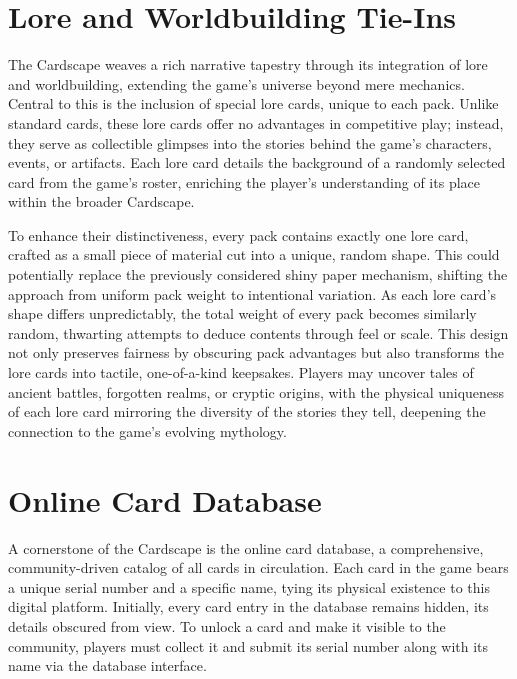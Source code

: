 \section{Lore and Worldbuilding Tie-Ins}

The Cardscape weaves a rich narrative tapestry through its integration of lore and worldbuilding, extending the game’s universe beyond mere mechanics. Central to this is the inclusion of special lore cards, unique to each pack. Unlike standard cards, these lore cards offer no advantages in competitive play; instead, they serve as collectible glimpses into the stories behind the game’s characters, events, or artifacts. Each lore card details the background of a randomly selected card from the game’s roster, enriching the player’s understanding of its place within the broader Cardscape.

To enhance their distinctiveness, every pack contains exactly one lore card, crafted as a small piece of material cut into a unique, random shape. This could potentially replace the previously considered shiny paper mechanism, shifting the approach from uniform pack weight to intentional variation. As each lore card’s shape differs unpredictably, the total weight of every pack becomes similarly random, thwarting attempts to deduce contents through feel or scale. This design not only preserves fairness by obscuring pack advantages but also transforms the lore cards into tactile, one-of-a-kind keepsakes. Players may uncover tales of ancient battles, forgotten realms, or cryptic origins, with the physical uniqueness of each lore card mirroring the diversity of the stories they tell, deepening the connection to the game’s evolving mythology.






\section{Online Card Database}

A cornerstone of the Cardscape is the online card database, a comprehensive, community-driven catalog of all cards in circulation. Each card in the game bears a unique serial number and a specific name, tying its physical existence to this digital platform. Initially, every card entry in the database remains hidden, its details obscured from view. To unlock a card and make it visible to the community, players must collect it and submit its serial number along with its name via the database interface.

